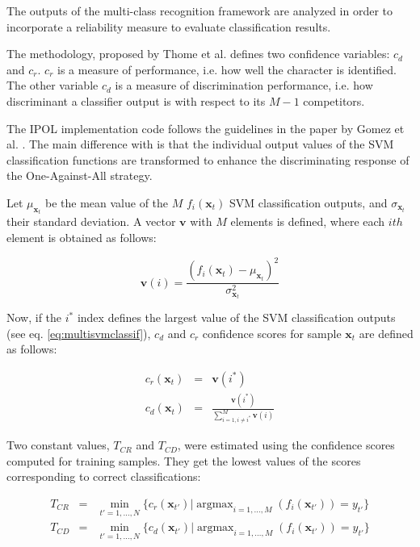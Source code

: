 \documentclass{ipol}
\def\x{{\mathbf x}}
\def\v{{\mathbf v}}
\DeclareMathOperator*{\argmax}{argmax}
\begin{document}
The outputs of the multi-class recognition framework are analyzed in order to incorporate a reliability measure to evaluate classification results.

The methodology, proposed by Thome et al. \cite{Thome:2010} defines two confidence variables: $c_d$ and $c_r$.
$c_r$ is a measure of performance, i.e. how well the character is identified.
The other variable $c_d$ is a measure of discrimination performance, i.e. how discriminant a classifier output is with respect to its $M-1$ competitors.

The IPOL implementation code follows the guidelines in the paper by Gomez et al. \cite{Gomez:2011}.
The main difference with \cite{Thome:2010} is that the individual output values of the SVM classification functions are transformed to enhance the discriminating response of the One-Against-All strategy.

Let $\mu_{\x_t}$ be the mean value of the $M$ $f_i(\x_t)$ SVM classification outputs, and $\sigma_{\x_t}$ their standard deviation.
A vector $\v$ with $M$ elements is defined, where each $ith$ element is obtained as follows:

\begin{displaymath}
\v(i) = \frac{(f_i(\x_t) - \mu_{\x_t})^2}{\sigma_{\x_t}^2}
\end{displaymath}

Now, if the $i^*$ index defines the largest value of the SVM classification outputs (see eq. \ref{eq:multisvmclassif}), $c_d$ and $c_r$ confidence scores for sample $\x_t$ are defined as follows:

\begin{eqnarray*}
c_r(\x_t) & = & \v(i^*) \\
c_d(\x_t) & = & \frac{\v(i^*)}{\sum_{i=1,i\neq i^*}^M \v(i)}
\end{eqnarray*}

Two constant values, $T_{CR}$ and $T_{CD}$, were estimated using the confidence scores computed for training samples.
They get the lowest values of the scores corresponding to correct classifications:

\begin{eqnarray*}
 T_{CR} & = & \min_{t'=1,\ldots,N} \{ c_r(\mathbf{x}_{t'}) | \argmax_{i=1,\ldots,M}(f_i(\mathbf{x}_{t'}))= y_{t'} \} \\
 T_{CD} & = & \min_{t'=1,\ldots,N} \{ c_d(\mathbf{x}_{t'}) | \argmax_{i=1,\ldots,M}(f_i(\mathbf{x}_{t'}))= y_{t'} \} \\
\end{eqnarray*}
\end{document}
